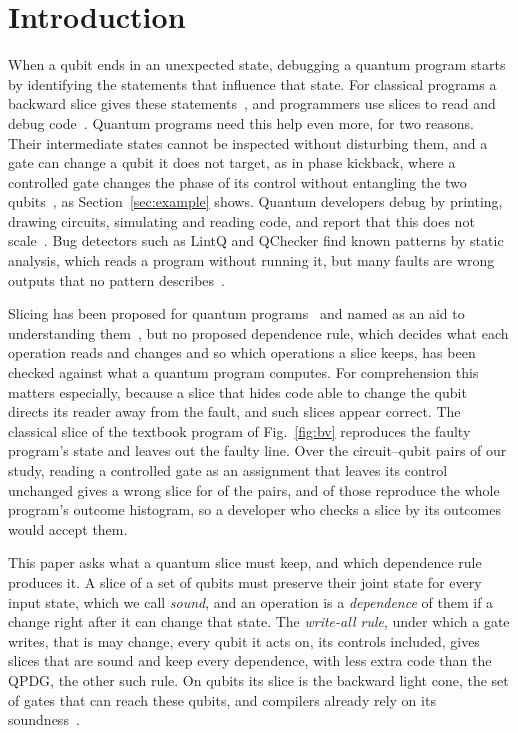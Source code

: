 \section{Introduction}\label{sec:intro}

When a qubit ends in an unexpected state, debugging a quantum program starts by identifying the statements that
influence that state. For classical programs a backward slice gives these statements~\cite{weiser1984program}, and
programmers use slices to read and debug code~\cite{weiser1982programmers, gallagher1991using}. Quantum programs need
this help even more, for two reasons. Their intermediate states cannot be inspected without disturbing them, and a gate
can change a qubit it does not target, as in phase kickback, where a controlled gate changes the phase of its control
without entangling the two qubits~\cite{nielsen2010quantum}, as Section~\ref{sec:example} shows. Quantum developers
debug by printing, drawing circuits, simulating and reading code, and report that this does not
scale~\cite{zappin2026challenges}. Bug detectors such as LintQ and QChecker find known patterns by static analysis,
which reads a program without running it, %
but many faults are wrong outputs that no pattern describes~\cite{paltenghi2024lintq, zhao2023qchecker}.

Slicing has been proposed for quantum programs~\cite{yu2025qpdg} and named as an aid to understanding
them~\cite{murillo2025roadmap}, but no proposed dependence rule, which decides what each operation reads and changes
and so which operations a slice keeps, has been checked against what a quantum program computes. For comprehension this matters especially, because a slice that hides code able to change the qubit directs its reader away from the fault,
and such slices appear correct. The classical slice of the textbook program of Fig.~\ref{fig:bv} reproduces the faulty
program's state and leaves out the faulty line. Over the \numNPairs{} circuit--qubit pairs of our study, reading a
controlled gate as an assignment that leaves its control unchanged gives a wrong slice for \numCpdgUnsoundPct{} of the
pairs, and \numFdCpdgZMatchPct{} of those reproduce the whole program's outcome histogram, so a developer who checks a
slice by its outcomes would accept them.

This paper asks what a quantum slice must keep, and which dependence rule produces it. A slice of a set of qubits must
preserve their joint state for every input state, which we call \emph{sound}, and an operation is a \emph{dependence}
of them if a change right after it can change that state. The \emph{write-all rule}, under which a gate writes, that is may change, every qubit it acts on, its controls
included, gives slices that are sound and keep every dependence, with less
extra code than the QPDG, the other such rule. On qubits its slice is the backward light cone, the set of gates that can reach these qubits, and
compilers already rely on its soundness~\cite{murali2019triq, qiskit2025}.

